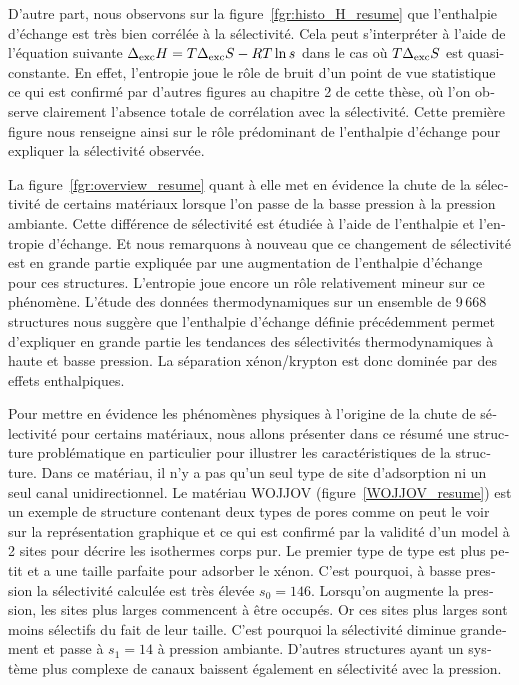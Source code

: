 \documentclass[thesis]{subfiles}
\begin{document}
\begin{otherlanguage}{french}
D'autre part, nous observons sur la figure~\ref{fgr:histo_H_resume} que l'enthalpie d'échange est très bien corrélée à la sélectivité. Cela peut s'interpréter à l'aide de l'équation suivante $\Delta_{\text{exc}}H= T\Delta_{\text{exc}}S - RT\ln{s}$ dans le cas où $T\Delta_{\text{exc}}S$ est quasi-constante. En effet, l'entropie joue le rôle de bruit d'un point de vue statistique ce qui est confirmé par d'autres figures au chapitre 2 de cette thèse, où l'on observe clairement l'absence totale de corrélation avec la sélectivité. Cette première figure nous renseigne ainsi sur le rôle prédominant de l'enthalpie d'échange pour expliquer la sélectivité observée. 

La figure~\ref{fgr:overview_resume} quant à elle met en évidence la chute de la sélectivité de certains matériaux lorsque l'on passe de la basse pression à la pression ambiante. Cette différence de sélectivité est étudiée à l'aide de l'enthalpie et l'entropie d'échange. Et nous remarquons à nouveau que ce changement de sélectivité est en grande partie expliquée par une augmentation de l'enthalpie d'échange pour ces structures. L'entropie joue encore un rôle relativement mineur sur ce phénomène. L'étude des données thermodynamiques sur un ensemble de 9\,668 structures nous suggère que l'enthalpie d'échange définie précédemment permet d'expliquer en grande partie les tendances des sélectivités thermodynamiques à haute et basse pression. La séparation xénon/krypton est donc dominée par des effets enthalpiques. 

Pour mettre en évidence les phénomènes physiques à l'origine de la chute de sélectivité pour certains matériaux, nous allons présenter dans ce résumé une structure problématique en particulier pour illustrer les caractéristiques de la structure. 
Dans ce matériau, il n'y a pas qu'un seul type de site d'adsorption ni un seul canal unidirectionnel. Le matériau WOJJOV (figure~\ref{WOJJOV_resume}) est un exemple de structure contenant deux types de pores comme on peut le voir sur la représentation graphique et ce qui est confirmé par la validité d'un model à 2 sites pour décrire les isothermes corps pur. Le premier type de type est plus petit et a une taille parfaite pour adsorber le xénon. C'est pourquoi, à basse pression la sélectivité calculée est très élevée $s_0=146$. Lorsqu'on augmente la pression, les sites plus larges commencent à être occupés. Or ces sites plus larges sont moins sélectifs du fait de leur taille. C'est pourquoi la sélectivité diminue grandement et passe à $s_1=14$ à pression ambiante. D'autres structures ayant un système plus complexe de canaux baissent également en sélectivité avec la pression.


\end{otherlanguage}
\end{document}
